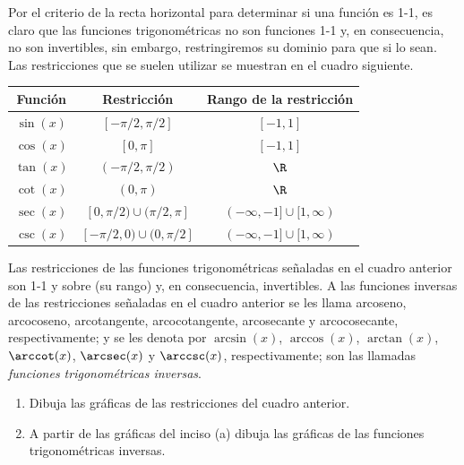 \documentclass[12pt,a4paper]{book}
\begin{document}
    \begin{ejercicio}\label{ej:126}
        Por el criterio de
        la recta horizontal para determinar si una función es 1-1, es claro que las
        funciones trigonométricas no son funciones 1-1 y, en consecuencia, no son
        invertibles, sin embargo, restringiremos su dominio para que si lo sean. Las
        restricciones que se suelen utilizar se muestran en el cuadro siguiente.
        \begin{center}
            \renewcommand{\arraystretch}{1.3}
            \begin{tabular}{|c|c|c|}
                \hline
                \textbf{Función} & \textbf{Restricción} & \textbf{Rango de la restricción}\\ \hline
                $\sin(x)$ & $[-\pi/2,\pi/2]$ & $[-1,1]$\\ \hline
                $\cos(x)$ & $[0,\pi]$ & $[-1,1]$\\ \hline
                $\tan(x)$ & $(-\pi/2,\pi/2)$ & $\R$\\ \hline
                $\cot(x)$ & $(0,\pi)$ & $\R$\\ \hline
                $\sec(x)$ & $[0,\pi/2)\cup(\pi/2,\pi]$ & $(-\infty,-1]\cup[1,\infty)$\\ \hline
                $\csc(x)$ & $[-\pi/2,0)\cup(0,\pi/2]$ & $(-\infty,-1]\cup[1,\infty)$\\ \hline
            \end{tabular}
        \end{center}
        Las restricciones de las funciones trigonométricas señaladas en el cuadro
        anterior son 1-1 y sobre (su rango) y, en consecuencia, invertibles. A las funciones
        inversas de las restricciones señaladas en el cuadro anterior se les llama
        arcoseno, arcocoseno, arcotangente, arcocotangente, arcosecante y arcocosecante,
        respectivamente; y se les denota por $\arcsin(x)$, $\arccos(x)$, $\arctan(x)$,
        $\arccot(x)$, $\arcsec(x)$ y $\arccsc(x)$, respectivamente; son las llamadas \textit{funciones
        trigonométricas inversas}.
        \begin{enumerate}[nosep]
            \item Dibuja las gráficas de las restricciones del cuadro anterior.
            \item A partir de las gráficas del inciso (a) dibuja las gráficas de las funciones
            trigonométricas inversas.
        \end{enumerate}
    \end{ejercicio}
\end{document}
